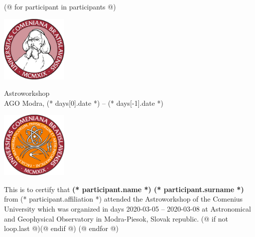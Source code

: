\documentclass[a4paper]{report}
\begin{document}
    (@ for participant in participants @)
        \begin{minipage}{\textwidth}
            \begin{minipage}{0.2\textwidth}
                \includegraphics[width=32mm]{input/logo.jpg}
            \end{minipage}
            \begin{minipage}{0.58\textwidth}
                \centering
                \fontsize{40}{50}\selectfont
                Astroworkshop\\
                \Large
                AGO Modra, (* days[0].date *) -- (* days[-1].date *)
            \end{minipage}
            \begin{minipage}{0.2\textwidth}
                \includegraphics[width=32mm]{input/fmfi.png}
            \end{minipage}
        \end{minipage}
        \vspace*{10mm}

        This is to certify that \textbf{(* participant.name *) (* participant.surname *)} from (* participant.affiliation *)
        attended the Astroworkshop of the Comenius University
        which was organized in days 2020-03-05 -- 2020-03-08
        at Astronomical and Geophysical Observatory in Modra-Piesok, Slovak republic.
        (@ if not loop.last @)\newpage(@ endif @)
    (@ endfor @)
\end{document}
